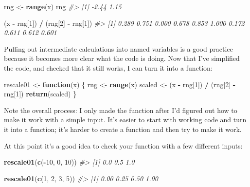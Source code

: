 \documentclass[]{book}
\newenvironment{Shaded}{\begin{snugshade}}{\end{snugshade}}
\newcommand{\CommentTok}[1]{\textcolor[rgb]{0.56,0.35,0.01}{\textit{#1}}}
\newcommand{\ControlFlowTok}[1]{\textcolor[rgb]{0.13,0.29,0.53}{\textbf{#1}}}
\newcommand{\DecValTok}[1]{\textcolor[rgb]{0.00,0.00,0.81}{#1}}
\newcommand{\KeywordTok}[1]{\textcolor[rgb]{0.13,0.29,0.53}{\textbf{#1}}}
\newcommand{\NormalTok}[1]{#1}
\newcommand{\OperatorTok}[1]{\textcolor[rgb]{0.81,0.36,0.00}{\textbf{#1}}}
\newcommand{\StringTok}[1]{\textcolor[rgb]{0.31,0.60,0.02}{#1}}
\begin{document}
\begin{Shaded}
\begin{Highlighting}[]
\NormalTok{rng <-}\StringTok{ }\KeywordTok{range}\NormalTok{(x)}
\NormalTok{rng}
\CommentTok{#> [1] -2.44  1.15}

\NormalTok{(x }\OperatorTok{-}\StringTok{ }\NormalTok{rng[}\DecValTok{1}\NormalTok{]) }\OperatorTok{/}\StringTok{ }\NormalTok{(rng[}\DecValTok{2}\NormalTok{] }\OperatorTok{-}\StringTok{ }\NormalTok{rng[}\DecValTok{1}\NormalTok{])}
\CommentTok{#>  [1] 0.289 0.751 0.000 0.678 0.853 1.000 0.172 0.611 0.612 0.601}
\end{Highlighting}
\end{Shaded}

Pulling out intermediate calculations into named variables is a good practice because it becomes more clear what the code is doing. Now that I've simplified the code, and checked that it still works, I can turn it into a function:

\begin{Shaded}
\begin{Highlighting}[]
\NormalTok{rescale01 <-}\StringTok{ }\ControlFlowTok{function}\NormalTok{(x) \{}
\NormalTok{  rng <-}\StringTok{ }\KeywordTok{range}\NormalTok{(x)}
\NormalTok{  scaled <-}\StringTok{ }\NormalTok{(x }\OperatorTok{-}\StringTok{ }\NormalTok{rng[}\DecValTok{1}\NormalTok{]) }\OperatorTok{/}\StringTok{ }\NormalTok{(rng[}\DecValTok{2}\NormalTok{] }\OperatorTok{-}\StringTok{ }\NormalTok{rng[}\DecValTok{1}\NormalTok{])}
  \KeywordTok{return}\NormalTok{(scaled)}
\NormalTok{\}}
\end{Highlighting}
\end{Shaded}

Note the overall process: I only made the function after I'd figured out how to make it work with a simple input. It's easier to start with working code and turn it into a function; it's harder to create a function and then try to make it work.

At this point it's a good idea to check your function with a few different inputs:

\begin{Shaded}
\begin{Highlighting}[]
\KeywordTok{rescale01}\NormalTok{(}\KeywordTok{c}\NormalTok{(}\OperatorTok{-}\DecValTok{10}\NormalTok{, }\DecValTok{0}\NormalTok{, }\DecValTok{10}\NormalTok{))}
\CommentTok{#> [1] 0.0 0.5 1.0}

\KeywordTok{rescale01}\NormalTok{(}\KeywordTok{c}\NormalTok{(}\DecValTok{1}\NormalTok{, }\DecValTok{2}\NormalTok{, }\DecValTok{3}\NormalTok{, }\DecValTok{5}\NormalTok{))}
\CommentTok{#> [1] 0.00 0.25 0.50 1.00}
\end{Highlighting}
\end{Shaded}
\end{document}
